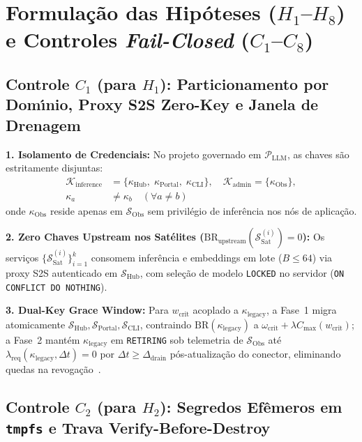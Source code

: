 \documentclass[10pt,twocolumn]{article}
\begin{document}
\section{Formula\c{c}\~{a}o das Hip\'{o}teses ($H_1$--$H_8$) e Controles \emph{Fail-Closed} ($C_1$--$C_8$)}

\subsection{Controle $C_1$ (para $H_1$): Particionamento por Dom\'{\i}nio, Proxy S2S Zero-Key e Janela de Drenagem}

\textbf{1. Isolamento de Credenciais:} No projeto governado em $\mathcal{P}_{\mathrm{LLM}}$, as chaves s\~{a}o estritamente disjuntas:
\begin{equation}
\begin{aligned}
\mathcal{K}_{\mathrm{inference}} &= \{\kappa_{\mathrm{Hub}}, \; \kappa_{\mathrm{Portal}}, \; \kappa_{\mathrm{CLI}}\}, \quad
\mathcal{K}_{\mathrm{admin}} = \{\kappa_{\mathrm{Obs}}\},\\
\kappa_a &\neq \kappa_b \quad (\forall a \neq b)
\end{aligned}
\end{equation}
onde $\kappa_{\mathrm{Obs}}$ reside apenas em $\mathcal{S}_{\mathrm{Obs}}$ sem privil\'{e}gio de infer\^{e}ncia nos n\'{o}s de aplica\c{c}\~{a}o.

\textbf{2. Zero Chaves Upstream nos Sat\'{e}lites ($\mathrm{BR}_{\mathrm{upstream}}(\mathcal{S}_{\mathrm{Sat}}^{(i)}) = 0$):} Os servi\c{c}os $\{\mathcal{S}_{\mathrm{Sat}}^{(i)}\}_{i=1}^{k}$ consomem infer\^{e}ncia e embeddings em lote ($B \le 64$) via proxy S2S autenticado em $\mathcal{S}_{\mathrm{Hub}}$, com sele\c{c}\~{a}o de modelo \texttt{LOCKED} no servidor (\texttt{ON CONFLICT DO NOTHING}).

\textbf{3. Dual-Key Grace Window:} Para $w_{\mathrm{crit}}$ acoplado a $\kappa_{\mathrm{legacy}}$, a Fase~1 migra atomicamente $\mathcal{S}_{\mathrm{Hub}}, \mathcal{S}_{\mathrm{Portal}}, \mathcal{S}_{\mathrm{CLI}}$, contraindo $\mathrm{BR}(\kappa_{\mathrm{legacy}})$ a $\omega_{\mathrm{crit}} + \lambda C_{\max}(w_{\mathrm{crit}})$; a Fase~2 mant\'{e}m $\kappa_{\mathrm{legacy}}$ em \texttt{RETIRING} sob telemetria de $\mathcal{S}_{\mathrm{Obs}}$ at\'{e} $\lambda_{\mathrm{req}}(\kappa_{\mathrm{legacy}}, \Delta t) = 0$ por $\Delta t \ge \Delta_{\mathrm{drain}}$ p\'{o}s-atualiza\c{c}\~{a}o do conector, eliminando quedas na revoga\c{c}\~{a}o~\cite{R01,R16,R20}.

\subsection{Controle $C_2$ (para $H_2$): Segredos Ef\^{e}meros em \texttt{tmpfs} e Trava Verify-Before-Destroy}
\end{document}
